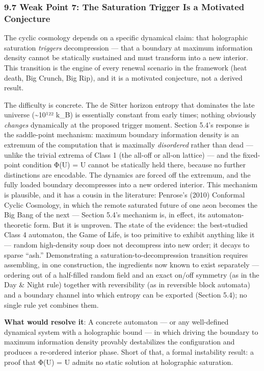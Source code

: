 \documentclass[
]{article}
\begin{document}
\hypertarget{weak-point-7-the-saturation-trigger-is-a-motivated-conjecture}{%
\subsubsection{9.7 Weak Point 7: The Saturation Trigger Is a Motivated
Conjecture}\label{weak-point-7-the-saturation-trigger-is-a-motivated-conjecture}}

The cyclic cosmology depends on a specific dynamical claim: that
holographic saturation \emph{triggers} decompression --- that a boundary
at maximum information density cannot be statically sustained and must
transform into a new interior. This transition is the engine of every
renewal scenario in the framework (heat death, Big Crunch, Big Rip), and
it is a motivated conjecture, not a derived result.

The difficulty is concrete. The de Sitter horizon entropy that dominates
the late universe (\textasciitilde10¹²² k\_B) is essentially constant
from early times; nothing obviously \emph{changes} dynamically at the
proposed trigger moment. Section 5.4's response is the saddle-point
mechanism: maximum boundary information density is an extremum of the
computation that is maximally \emph{disordered} rather than dead ---
unlike the trivial extrema of Class 1 (the all-off or all-on lattice)
--- and the fixed-point condition Φ(U) = U cannot be statically held
there, because no further distinctions are encodable. The dynamics are
forced off the extremum, and the fully loaded boundary decompresses into
a new ordered interior. This mechanism is plausible, and it has a cousin
in the literature: Penrose's (2010) Conformal Cyclic Cosmology, in which
the remote saturated future of one aeon becomes the Big Bang of the next
--- Section 5.4's mechanism is, in effect, its automaton-theoretic form.
But it is unproven. The state of the evidence: the best-studied Class 4
automaton, the Game of Life, is too primitive to exhibit anything like
it --- random high-density soup does not decompress into new order; it
decays to sparse ``ash.'' Demonstrating a saturation-to-decompression
transition requires assembling, in one construction, the ingredients now
known to exist separately --- ordering out of a half-filled random field
and an exact on/off symmetry (as in the Day \& Night rule) together with
reversibility (as in reversible block automata) and a boundary channel
into which entropy can be exported (Section 5.4); no single rule yet
combines them.

\textbf{What would resolve it}: A concrete automaton --- or any
well-defined dynamical system with a holographic bound --- in which
driving the boundary to maximum information density provably
destabilizes the configuration and produces a re-ordered interior phase.
Short of that, a formal instability result: a proof that Φ(U) = U admits
no static solution at holographic saturation.
\end{document}
